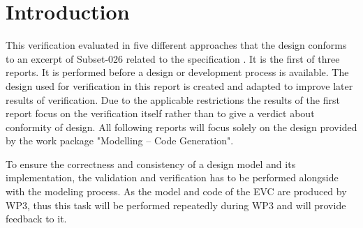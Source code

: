 \documentclass{template/openetcs_article}
\begin{document}
\maketitle \tableofcontents \listoffiguresandtables \newpage




\section{Introduction}
This verification evaluated in five different approaches that the design conforms to an excerpt of Subset-026 \cite{unisig_subset-026_2012}  related to the specification \cite{tsi-2012-88-eu} \cite{tsi-2012-696-eu}.  It is the first of three reports. It is performed before a design or development process is available. The design used for verification in this report is created and adapted to improve later results of verification. Due to the applicable restrictions the results of the first report focus on the verification itself rather than to give a verdict about conformity of design. All following reports will focus solely on the design provided by the work package "Modelling – Code Generation".

To ensure the correctness and consistency of a design model and its implementation, the
validation and verification has to be performed alongside with the modeling process. 
As the model and code of the EVC are produced by WP3,
thus this task will be performed repeatedly during WP3 and will provide
feedback to it.


\newpage



\newpage


\let\oldparagraph\paragraph
\let\oldsubparagraph\subparagraph

\renewcommand{\paragraph}[1]{\subsection{#1}}
\renewcommand{\subparagraph}[1]{\subsubsection{#1}}
\end{document}
